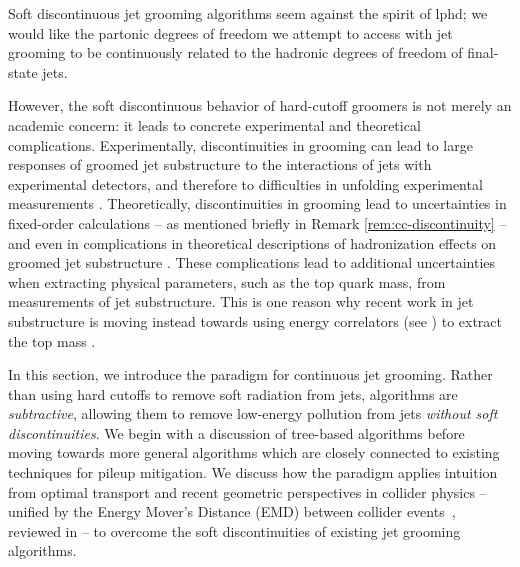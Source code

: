 Soft discontinuous jet grooming algorithms seem against the spirit of \gls{lphd};
%
we would like the partonic degrees of freedom we attempt to access with jet grooming to be continuously related to the hadronic degrees of freedom of final-state jets.

However, the soft discontinuous behavior of hard-cutoff groomers is not merely an academic concern:
%
it leads to concrete experimental and theoretical complications.
%
Experimentally, discontinuities in grooming can lead to large responses of groomed jet substructure to the interactions of jets with experimental detectors, and therefore to difficulties in unfolding experimental measurements \cite{ATL-PHYS-PUB-2019-027,Aad:2019vyi,ATLAS:2020gwe}.
%
Theoretically, discontinuities in grooming lead to uncertainties in fixed-order calculations \cite{Larkoski:2014wba} -- as mentioned briefly in Remark \ref{rem:cc-discontinuity} -- and even in complications in theoretical descriptions of \gls{hadronization} effects on groomed jet substructure \cite{Hoang:2019ceu}.
%
These complications lead to additional uncertainties when extracting physical parameters, such as the top quark mass, from measurements of jet substructure.
%
This is one reason why recent work in jet substructure is moving instead towards using energy correlators (see ) to extract the top mass \cite{}.


In this section, we introduce the \PIRANHA{} paradigm for continuous jet grooming.
%
Rather than using hard cutoffs to remove soft radiation from jets, \PIRANHA{} algorithms are \textit{subtractive}, allowing them to remove low-energy pollution from jets \textit{without soft discontinuities}.
%
We begin with a discussion of tree-based \PIRANHA{} algorithms before moving towards more general algorithms which are closely connected to existing techniques for \gls{pileup} mitigation.
%
We discuss how the \PIRANHA{} paradigm applies intuition from optimal transport and recent geometric perspectives in collider physics -- unified by the Energy Mover's Distance (EMD) between collider events~\cite{Komiske:2019fks,Komiske:2020qhg}, reviewed in  -- to overcome the soft discontinuities of existing jet grooming algorithms.

